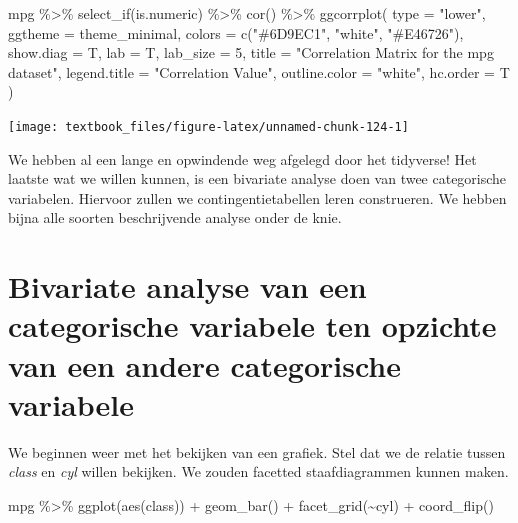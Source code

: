 \documentclass[]{tufte-book}
\newenvironment{Shaded}{}{}
\newcommand{\AttributeTok}[1]{\textcolor[rgb]{0.49,0.56,0.16}{#1}}
\newcommand{\DecValTok}[1]{\textcolor[rgb]{0.25,0.63,0.44}{#1}}
\newcommand{\FunctionTok}[1]{\textcolor[rgb]{0.02,0.16,0.49}{#1}}
\newcommand{\NormalTok}[1]{#1}
\newcommand{\SpecialCharTok}[1]{\textcolor[rgb]{0.25,0.44,0.63}{#1}}
\newcommand{\StringTok}[1]{\textcolor[rgb]{0.25,0.44,0.63}{#1}}
\begin{document}
\begin{Shaded}
\begin{Highlighting}[]
\NormalTok{mpg }\SpecialCharTok{\%\textgreater{}\%}
  \FunctionTok{select\_if}\NormalTok{(is.numeric) }\SpecialCharTok{\%\textgreater{}\%}
  \FunctionTok{cor}\NormalTok{() }\SpecialCharTok{\%\textgreater{}\%}
  \FunctionTok{ggcorrplot}\NormalTok{(}
    \AttributeTok{type =} \StringTok{"lower"}\NormalTok{, }\AttributeTok{ggtheme =}\NormalTok{ theme\_minimal, }\AttributeTok{colors =} \FunctionTok{c}\NormalTok{(}\StringTok{"\#6D9EC1"}\NormalTok{, }\StringTok{"white"}\NormalTok{, }\StringTok{"\#E46726"}\NormalTok{),}
    \AttributeTok{show.diag =}\NormalTok{ T,}
    \AttributeTok{lab =}\NormalTok{ T, }\AttributeTok{lab\_size =} \DecValTok{5}\NormalTok{,}
    \AttributeTok{title =} \StringTok{"Correlation Matrix for the mpg dataset"}\NormalTok{,}
    \AttributeTok{legend.title =} \StringTok{"Correlation Value"}\NormalTok{,}
    \AttributeTok{outline.color =} \StringTok{"white"}\NormalTok{,}
    \AttributeTok{hc.order =}\NormalTok{ T}
\NormalTok{  )}
\end{Highlighting}
\end{Shaded}

\texttt{[image: textbook\_files/figure-latex/unnamed-chunk-124-1]}

We hebben al een lange en opwindende weg afgelegd door het tidyverse! Het laatste wat we willen kunnen, is een bivariate analyse doen van twee categorische variabelen. Hiervoor zullen we contingentietabellen leren construeren. We hebben bijna alle soorten beschrijvende analyse onder de knie.

\hypertarget{bivariate-analyse-van-een-categorische-variabele-ten-opzichte-van-een-andere-categorische-variabele}{%
\section{Bivariate analyse van een categorische variabele ten opzichte van een andere categorische variabele}\label{bivariate-analyse-van-een-categorische-variabele-ten-opzichte-van-een-andere-categorische-variabele}}

We beginnen weer met het bekijken van een grafiek. Stel dat we de relatie tussen \emph{class} en \emph{cyl} willen bekijken. We zouden facetted staafdiagrammen kunnen maken.

\begin{Shaded}
\begin{Highlighting}[]
\NormalTok{mpg }\SpecialCharTok{\%\textgreater{}\%}
  \FunctionTok{ggplot}\NormalTok{(}\FunctionTok{aes}\NormalTok{(class)) }\SpecialCharTok{+}
  \FunctionTok{geom\_bar}\NormalTok{() }\SpecialCharTok{+}
  \FunctionTok{facet\_grid}\NormalTok{(}\SpecialCharTok{\textasciitilde{}}\NormalTok{cyl) }\SpecialCharTok{+}
  \FunctionTok{coord\_flip}\NormalTok{()}
\end{Highlighting}
\end{Shaded}
\end{document}
